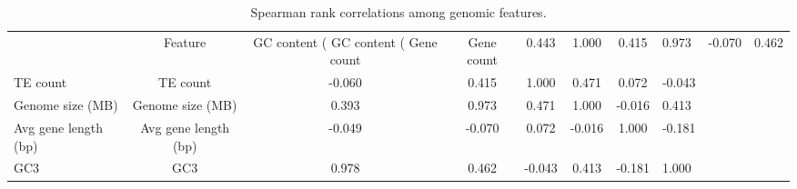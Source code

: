 \begin{table}
\caption{Spearman rank correlations among genomic features.}
\label{tab:correlations}
\begin{tabular}{lcccccc}
\toprule
 & Feature & GC content (%
\midrule
GC content (%
Gene count & Gene count & 0.443 & 1.000 & 0.415 & 0.973 & -0.070 & 0.462 \\
TE count & TE count & -0.060 & 0.415 & 1.000 & 0.471 & 0.072 & -0.043 \\
Genome size (MB) & Genome size (MB) & 0.393 & 0.973 & 0.471 & 1.000 & -0.016 & 0.413 \\
Avg gene length (bp) & Avg gene length (bp) & -0.049 & -0.070 & 0.072 & -0.016 & 1.000 & -0.181 \\
GC3 & GC3 & 0.978 & 0.462 & -0.043 & 0.413 & -0.181 & 1.000 \\
\bottomrule
\end{tabular}
\end{table}
